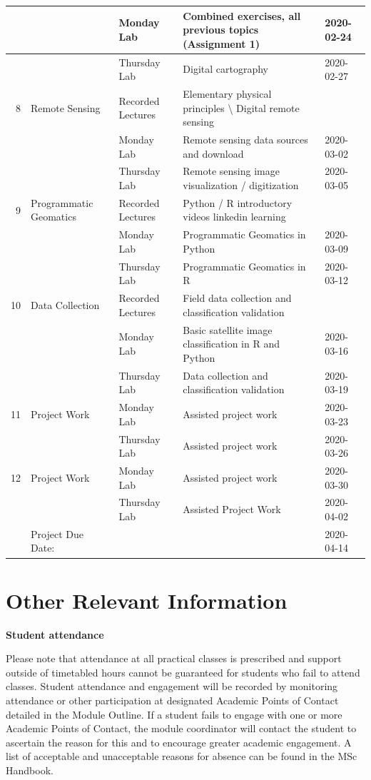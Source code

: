 \documentclass[
]{book}
\begin{document}
\begin{table}
\begin{tabular}[t]{r|l|l|l|l}
\hline
 &  & Monday Lab & Combined exercises, all previous topics (Assignment 1) & 2020-02-24\\
\hline
 &  & Thursday Lab & Digital cartography & 2020-02-27\\
\hline
8 & Remote Sensing & Recorded Lectures & Elementary physical principles \textbackslash{} Digital remote sensing & \\
\hline
 &  & Monday Lab & Remote sensing data sources and download & 2020-03-02\\
\hline
 &  & Thursday Lab & Remote sensing image visualization / digitization & 2020-03-05\\
\hline
9 & Programmatic Geomatics & Recorded Lectures & Python / R introductory videos linkedin learning & \\
\hline
 &  & Monday Lab & Programmatic Geomatics in Python & 2020-03-09\\
\hline
 &  & Thursday Lab & Programmatic Geomatics in R & 2020-03-12\\
\hline
10 & Data Collection & Recorded Lectures & Field data collection  and classification validation & \\
\hline
 &  & Monday Lab & Basic satellite image classification in R and Python & 2020-03-16\\
\hline
 &  & Thursday Lab & Data collection and classification validation & 2020-03-19\\
\hline
11 & Project Work & Monday Lab & Assisted project work & 2020-03-23\\
\hline
 &  & Thursday Lab & Assisted project work & 2020-03-26\\
\hline
12 & Project Work & Monday Lab & Assisted project work & 2020-03-30\\
\hline
 &  & Thursday Lab & Assisted Project Work & 2020-04-02\\
\hline
 & Project Due Date: &  &  & 2020-04-14\\
\hline
\end{tabular}
\end{table}

\hypertarget{other-relevant-information}{%
\section{Other Relevant Information}\label{other-relevant-information}}

\textbf{Student attendance}

Please note that attendance at all practical classes is prescribed and support outside of timetabled hours cannot be guaranteed for students who fail to attend classes.
Student attendance and engagement will be recorded by monitoring attendance or other participation at designated Academic Points of Contact detailed in the Module Outline. If a student fails to engage with one or more Academic Points of Contact, the module coordinator will contact the student to ascertain the reason for this and to encourage greater academic engagement. A list of acceptable and unacceptable reasons for absence can be found in the MSc Handbook.
\end{document}
